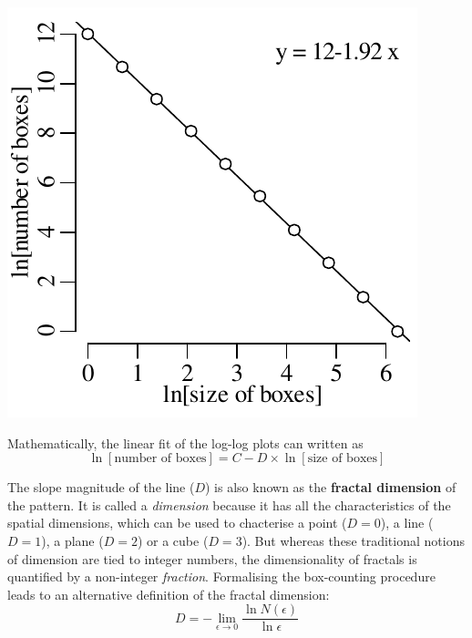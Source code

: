 \noindent\begin{minipage}[t][][b]{.3\textwidth}
  \includegraphics[width=\textwidth]{../figures/sierpinskiboxcounts.pdf}\medskip
\end{minipage}
\begin{minipage}[t][][t]{.7\textwidth}
  \label{fig:sierpinskiboxcounts}
\end{minipage}

Mathematically, the linear fit of the log-log plots can written as
\begin{equation}
  \ln[\mbox{number of boxes}] = C - D \times \ln[\mbox{size of boxes}]
  \label{eq:fractaldim}
\end{equation}

The slope magnitude of the line ($D$) is also known as the
\textbf{fractal dimension} of the pattern. It is called a
\emph{dimension} because it has all the characteristics of the spatial
dimensions, which can be used to chacterise a point ($D=0$), a line
($D=1$), a plane ($D=2$) or a cube ($D=3$). But whereas these
traditional notions of dimension are tied to integer numbers, the
dimensionality of fractals is quantified by a non-integer
\emph{fraction}. Formalising the box-counting procedure leads to an
alternative definition of the fractal dimension:
\begin{equation}
  D = -\lim\limits_{\epsilon \to 0}\frac{\ln{N(\epsilon)}}{\ln{\epsilon}}
  \label{eq:Minkowski}
\end{equation}

